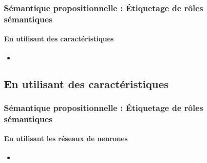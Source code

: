 \documentclass[xcolor=table]{beamer}
\begin{document}
\begin{frame}
	\frametitle{Sémantique propositionnelle : Étiquetage de rôles sémantiques}
	\framesubtitle{En utilisant des caractéristiques}
	
	\begin{itemize}
		\item 
	\end{itemize}
	
\end{frame}

\subsection{En utilisant des caractéristiques}

\begin{frame}
	\frametitle{Sémantique propositionnelle : Étiquetage de rôles sémantiques}
	\framesubtitle{En utilisant les réseaux de neurones}
	
	\begin{itemize}
		\item 
	\end{itemize}
	
\end{frame}

\end{document}
